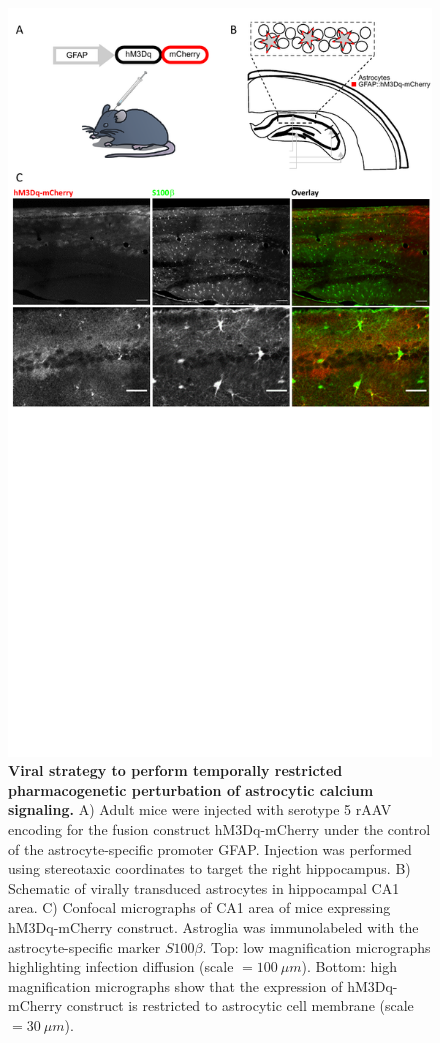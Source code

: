 \begin{figure}[h]
    \centering
    \includegraphics[trim={0 320 0 0},clip,width=\textwidth]{Figures/Chapter4/mcherry_dq_expression.pdf}
    \caption[Viral strategy to perform temporally restricted pharmacogenetic perturbation of astrocytic calcium signaling.]{\textbf{Viral strategy to perform temporally restricted pharmacogenetic perturbation of astrocytic calcium signaling.} 
    A) Adult mice were injected with serotype 5 rAAV encoding for the fusion construct hM3Dq-mCherry under the control of the astrocyte-specific promoter GFAP. 
    Injection was performed using stereotaxic coordinates to target the right hippocampus. 
    B) Schematic of virally transduced astrocytes in hippocampal CA1 area. 
    C) Confocal micrographs of CA1 area of mice expressing hM3Dq-mCherry construct. Astroglia was immunolabeled with the astrocyte-specific marker $S100\beta$. 
    Top: low magnification micrographs highlighting infection diffusion (scale $= 100\ \mu m$). 
    Bottom: high magnification micrographs show that the expression of hM3Dq-mCherry construct is restricted to astrocytic cell membrane (scale $= 30\ \mu m$).}
    \label{fig:chap4:mcherry_dq_expression}
\end{figure}

